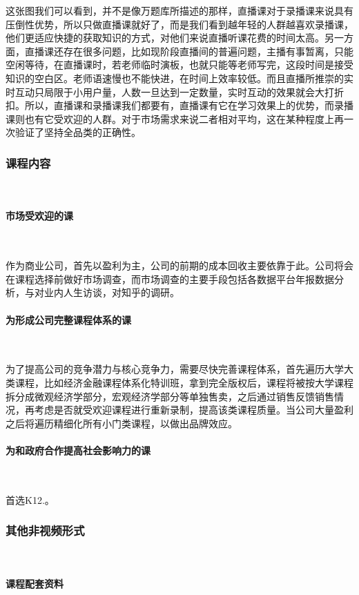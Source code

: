 这张图我们可以看到，并不是像万题库所描述的那样，直播课对于录播课来说具有压倒性优势，所以只做直播课就好了，而是我们看到越年轻的人群越喜欢录播课，他们更适应快捷的获取知识的方式，对他们来说直播听课花费的时间太高。另一方面，直播课还存在很多问题，比如现阶段直播间的普遍问题，主播有事暂离，只能空闲等待，在直播课时，若老师临时演板，也就只能等老师写完，这段时间是接受知识的空白区。老师语速慢也不能快进，在时间上效率较低。而且直播所推崇的实时互动只局限于小用户量，人数一旦达到一定数量，实时互动的效果就会大打折扣。所以，直播课和录播课我们都要有，直播课有它在学习效果上的优势，而录播课则也有它受欢迎的人群。对于市场需求来说二者相对平均，这在某种程度上再一次验证了坚持全品类的正确性。

\subsubsection{课程内容}\

\paragraph{市场受欢迎的课}\

作为商业公司，首先以盈利为主，公司的前期的成本回收主要依靠于此。公司将会在课程选择前做好市场调查，而市场调查的主要手段包括各数据平台年报数据分析，与对业内人生访谈，对知乎的调研。

\paragraph{为形成公司完整课程体系的课}\

为了提高公司的竞争潜力与核心竞争力，需要尽快完善课程体系，首先遍历大学大类课程，比如经济金融课程体系化特训班，拿到完全版权后，课程将被按大学课程拆分成微观经济学部分，宏观经济学部分等单独售卖，之后通过销售反馈销售情况，再考虑是否就受欢迎课程进行重新录制，提高该类课程质量。当公司大量盈利之后将遍历精细化所有小门类课程，以做出品牌效应。

\paragraph{为和政府合作提高社会影响力的课}\

首选K12.。

\subsubsection{其他非视频形式}\

\paragraph{课程配套资料}\

